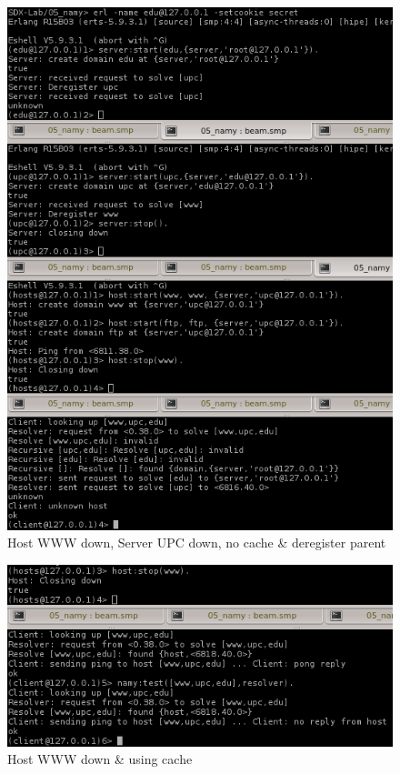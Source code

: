 \begin{figure}[h!]
\centering
\includegraphics[scale=1]{resources/img/hostWWWdown_serverUPCdown_NoCache_deregisterParent.png}
\caption{Host WWW down, Server UPC down, no cache \& deregister parent}
\end{figure}


\begin{figure}[h!]
\centering
\includegraphics[scale=1]{resources/img/hostWWWdown_cache.png}
\caption{Host WWW down \& using cache}
\end{figure}

